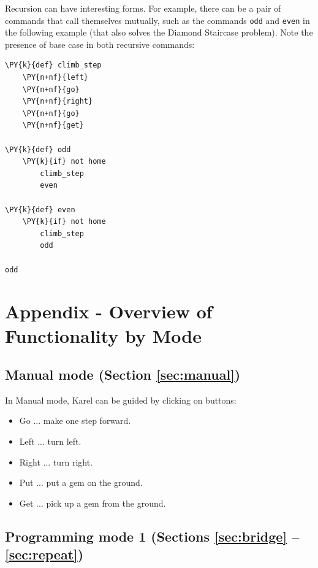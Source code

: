 Recursion can have interesting forms. For example, there can be a pair of commands
that call themselves mutually, such as the commands {\tt odd} and 
{\tt even} in the following example (that also solves the Diamond Staircase
problem). Note the presence of base case in both recursive commands:\\
 
\begin{bbox}
\begin{Verbatim}[commandchars=\\\{\}]
\PY{k}{def} climb_step
    \PY{n+nf}{left}
    \PY{n+nf}{go}
    \PY{n+nf}{right}
    \PY{n+nf}{go}
    \PY{n+nf}{get} 

\PY{k}{def} odd
    \PY{k}{if} not home
        climb_step
        even

\PY{k}{def} even
    \PY{k}{if} not home
        climb_step
        odd
    
odd
\end{Verbatim}
\end{bbox}


\section{Appendix - Overview of Functionality by Mode}\label{sec:newfunc3}

\subsection[\ \ Manual mode (Section \ref{sec:manual})]{Manual mode (Section \ref{sec:manual})}

In Manual mode, Karel can be guided by clicking on buttons:
\begin{itemize}
\item Go ... make one step forward.
\item Left ... turn left.
\item Right ... turn right.
\item Put ... put a gem on the ground.
\item Get ... pick up a gem from the ground.
\end{itemize}

\subsection[\ \ Programming mode 1 (Sections \ref{sec:bridge} -- \ref{sec:repeat})]{Programming mode 1 (Sections \ref{sec:bridge} -- \ref{sec:repeat})}

